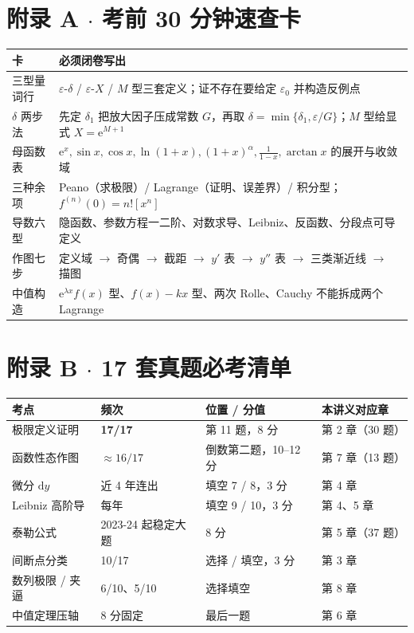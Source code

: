 \documentclass[11pt,a4paper]{ctexart}
\newcommand{\eps}{\varepsilon}
\newcommand{\ee}{\mathrm{e}}
\newcommand{\D}{\mathrm{d}}
\begin{document}
\section*{附录 A $\cdot$ 考前 30 分钟速查卡}
{\footnotesize
\begin{longtable}{@{}p{3.0cm}p{12.2cm}@{}}
\toprule
\textbf{卡} & \textbf{必须闭卷写出} \\
\midrule
三型量词行 & $\eps$-$\delta$ / $\eps$-$X$ / $M$ 型三套定义；证不存在要给定 $\eps_0$ 并构造反例点 \\
$\delta$ 两步法 & 先定 $\delta_1$ 把放大因子压成常数 $G$，再取 $\delta=\min\{\delta_1,\eps/G\}$；$M$ 型给显式 $X=\ee^{M+1}$ \\
母函数表 & $\ee^x,\sin x,\cos x,\ln(1+x),(1+x)^\alpha,\frac1{1-x},\arctan x$ 的展开与收敛域 \\
三种余项 & Peano（求极限）/ Lagrange（证明、误差界）/ 积分型；$f^{(n)}(0)=n![x^n]$ \\
导数六型 & 隐函数、参数方程一二阶、对数求导、Leibniz、反函数、分段点可导定义 \\
作图七步 & 定义域 $\to$ 奇偶 $\to$ 截距 $\to$ $y'$ 表 $\to$ $y''$ 表 $\to$ 三类渐近线 $\to$ 描图 \\
中值构造 & $\ee^{\lambda x}f(x)$ 型、$f(x)-kx$ 型、两次 Rolle、Cauchy 不能拆成两个 Lagrange \\
\bottomrule
\end{longtable}}

\section*{附录 B $\cdot$ 17 套真题必考清单}
{\footnotesize
\begin{longtable}{@{}p{3.4cm}p{2.1cm}p{3.0cm}p{6.7cm}@{}}
\toprule
\textbf{考点} & \textbf{频次} & \textbf{位置 / 分值} & \textbf{本讲义对应章} \\
\midrule
极限定义证明 & \textbf{17/17} & 第 11 题，8 分 & 第 2 章（30 题） \\
函数性态作图 & $\approx16/17$ & 倒数第二题，10--12 分 & 第 7 章（13 题） \\
微分 $\D y$ & 近 4 年连出 & 填空 7 / 8，3 分 & 第 4 章 \\
Leibniz 高阶导 & 每年 & 填空 9 / 10，3 分 & 第 4、5 章 \\
泰勒公式 & 2023-24 起稳定大题 & 8 分 & 第 5 章（37 题） \\
间断点分类 & 10/17 & 选择 / 填空，3 分 & 第 3 章 \\
数列极限 / 夹逼 & 6/10、5/10 & 选择填空 & 第 8 章 \\
中值定理压轴 & 8 分固定 & 最后一题 & 第 6 章 \\
\bottomrule
\end{longtable}}
\end{document}
